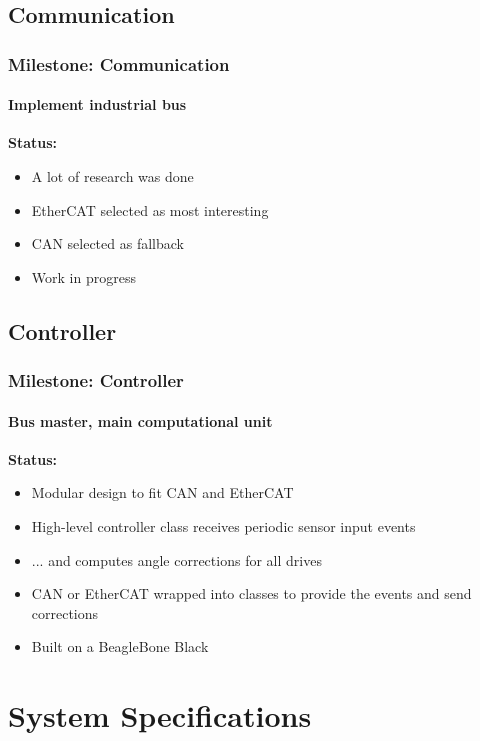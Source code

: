 \documentclass{beamer}
\begin{document}
\subsection{Communication}
\begin{frame}
  \frametitle{Milestone: Communication}
  \framesubtitle{Implement industrial bus}
  \textbf{Status:}
	\begin{itemize}
		\item A lot of research was done
		\item EtherCAT selected as most interesting
		\item CAN selected as fallback
		\item Work in progress
	\end{itemize}
\end{frame}

\subsection{Controller}
\begin{frame}
  \frametitle{Milestone: Controller}
  \framesubtitle{Bus master, main computational unit}
  \textbf{Status:}
	\begin{itemize}
		\item Modular design to fit CAN and EtherCAT
		\item High-level controller class receives periodic sensor input events
		\item ... and computes angle corrections for all drives
		\item CAN or EtherCAT wrapped into classes to provide the events and send corrections
		\item Built on a BeagleBone Black
	\end{itemize}
\end{frame}


\section{System Specifications}
\end{document}
